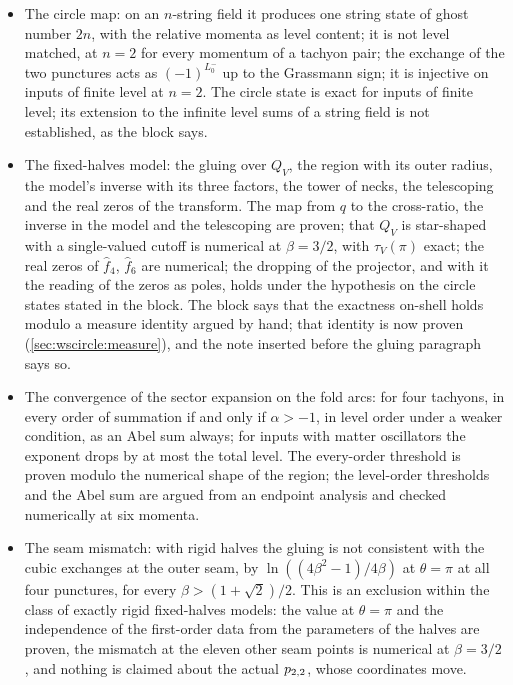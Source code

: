 \begin{itemize}
  \setlength{\itemsep}{0.5ex}

  \item The circle map: on an $n$-string field it produces one string state of ghost number $2 n$, with the relative momenta as level content; it is not level matched, at $n = 2$ for every momentum of a tachyon pair; the exchange of the two punctures acts as $(-1)^{L_0^-}$ up to the Grassmann sign; it is injective on inputs of finite level at $n = 2$.
    The circle state is exact for inputs of finite level; its extension to the infinite level sums of a string field is not established, as the block says.

  \item The fixed-halves model: the gluing over $Q_V$, the region with its outer radius, the model's inverse with its three factors, the tower of necks, the telescoping and the real zeros of the transform.
    The map from $q$ to the cross-ratio, the inverse in the model and the telescoping are proven; that $Q_V$ is star-shaped with a single-valued cutoff is numerical at $\beta = 3 / 2$, with $\tau_V(\pi)$ exact; the real zeros of $\hat f_4$, $\hat f_6$ are numerical; the dropping of the projector, and with it the reading of the zeros as poles, holds under the hypothesis on the circle states stated in the block.
    The block says that the exactness on-shell holds modulo a measure identity argued by hand; that identity is now proven (\cref{sec:wscircle:measure}), and the note inserted before the gluing paragraph says so.

  \item The convergence of the sector expansion on the fold arcs: for four tachyons, in every order of summation if and only if $\alpha > - 1$, in level order under a weaker condition, as an Abel sum always; for inputs with matter oscillators the exponent drops by at most the total level.
    The every-order threshold is proven modulo the numerical shape of the region; the level-order thresholds and the Abel sum are argued from an endpoint analysis and checked numerically at six momenta.

  \item The seam mismatch: with rigid halves the gluing is not consistent with the cubic exchanges at the outer seam, by $\ln ((4 \beta^2 - 1) / 4 \beta)$ at $\theta = \pi$ at all four punctures, for every $\beta > (1 + \sqrt 2) / 2$.
    This is an exclusion within the class of exactly rigid fixed-halves models: the value at $\theta = \pi$ and the independence of the first-order data from the parameters of the halves are proven, the mismatch at the eleven other seam points is numerical at $\beta = 3 / 2$, and nothing is claimed about the actual $p_{2,2}$, whose coordinates move.


\end{itemize}
